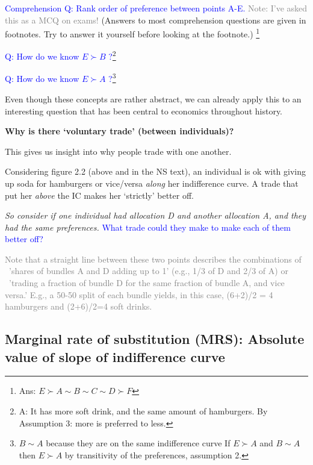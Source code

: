 \documentclass[]{article}
\begin{document}
\textcolor{blue}{Comprehension Q: Rank order of preference between points A-E.}
\textcolor{gray}{Note: I've asked this as a MCQ on exams!} (Answers to
most comprehension questions are given in footnotes. Try to answer it
yourself before looking at the footnote.) \footnote{Ans:
  \(E \succ A \sim B \sim C \sim D \succ F\)}

\bigskip

\textcolor{blue}{Q: How do we know $E \succ B$ ?}\footnote{A: It has
  more soft drink, and the same amount of hamburgers. By Assumption 3:
  more is preferred to less.}

\bigskip

\textcolor{blue}{Q:  How do we know $E \succ A$ ?}\footnote{\(B \sim A\)
  because they are on the same indifference curve If \(E \succ A\) and
  \(B \sim A\) then \(E \succ A\) by transitivity of the preferences,
  assumption 2.}

\bigskip

Even though these concepts are rather abstract, we can already apply
this to an interesting question that has been central to economics
throughout history.

\textbf{Why is there `voluntary trade' (between individuals)?}

This gives us insight into why people trade with one another.

Considering figure 2.2 (above and in the NS text), an individual is ok
with giving up soda for hamburgers or vice/versa \emph{along} her
indifference curve. A trade that put her \emph{above} the IC makes her
`strictly' better off.

\emph{So consider if one individual had allocation D and another
allocation A, and they had the same preferences.}
\textcolor{blue}{What trade could they make to make each of them better off?}

\textcolor{gray}{Note that a straight line between these two points describes the combinations of \
'shares of bundles A and D adding up to 1' (e.g., 1/3 of D and 2/3 of A)
or \
'trading a fraction of bundle D for the same fraction of bundle A, and vice versa.'
E.g., a 50-50 split of each bundle yields, in this case, (6+2)/2 = 4 hamburgers and (2+6)/2=4 soft drinks.}

\hypertarget{marginal-rate-of-substitution-mrs-absolute-value-of-slope-of-indifference-curve}{%
\subsection{Marginal rate of substitution (MRS): Absolute value of slope
of indifference
curve}\label{marginal-rate-of-substitution-mrs-absolute-value-of-slope-of-indifference-curve}}
\end{document}
